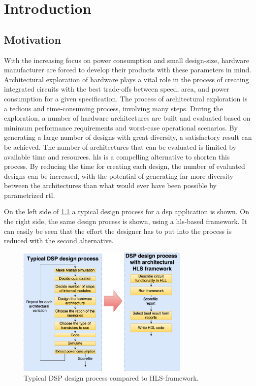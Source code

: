 \chapter{Introduction}
\label{chp:introduction} 
\section{\label{sec:motivation}Motivation}
With the increasing focus on power consumption and small design-size, hardware manufacturer are forced to develop their products with these parameters in mind. Architectural exploration of hardware plays a vital role in the process of creating integrated circuits with the best trade-offs between speed, area, and power consumption for a given specification. The process of architectural exploration is a tedious and time-consuming process, involving many steps. During the exploration, a number of hardware architectures are built and evaluated based on minimum performance requirements and worst-case operational scenarios. By generating a large number of designs with great diversity, a satisfactory result can be achieved. The number of architectures that can be evaluated is limited by available time and resources. \gls{hls} is a compelling alternative to shorten this process. By reducing the time for creating each design, the number of evaluated designs can be increased, with the potential of generating far more diversity between the architectures than what would ever have been possible by parametrized \gls{rtl}.

On the left side of \cref{fig:motivationflow} a typical design process for a \gls{dsp} application is shown. On the right side, the same design process is shown, using a \gls{hls}-based framework. It can easily be seen that the effort the designer has to put into the process is reduced with the second alternative.

\begin{figure}[hbpt]
\centering
\includegraphics[width=0.75\textwidth]{../figs/Motivation.png}
\caption{\label{fig:motivationflow}Typical DSP design process compared to HLS-framework.}
\end{figure}

